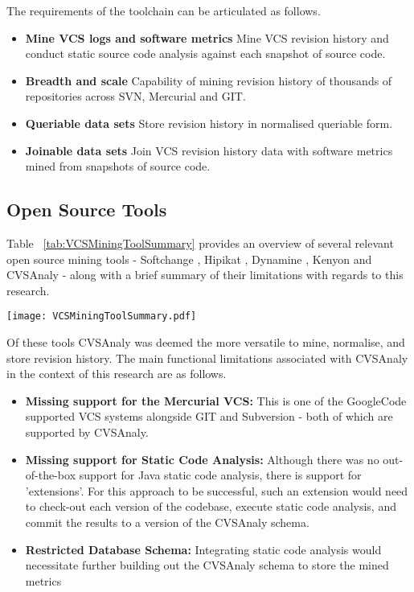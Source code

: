 The requirements of the toolchain can be articulated as follows.
\begin{itemize}
\item \textbf{Mine VCS logs and software metrics} Mine VCS revision history and conduct static source code analysis against each snapshot of source code.
\item \textbf{Breadth and scale} Capability of mining revision history of thousands of repositories across SVN, Mercurial and GIT.
\item \textbf{Queriable data sets} Store revision history in normalised queriable form.
\item \textbf{Joinable data sets} Join VCS revision history data with software metrics mined from snapshots of source code.
\end{itemize}

\subsection{Open Source Tools}
Table ~\ref{tab:VCSMiningToolSummary} provides an overview of several relevant open source mining tools - Softchange \citep{german2004mining}, Hipikat \citep{vcubranic2003hipikat}, Dynamine \citep{livshits2005dynamine}, Kenyon \citep{bevan2005facilitating} and CVSAnaly \citep{robles2004remote} - along with a brief summary of their limitations with regards to this research.

\begin{table}
\centering 
{}
\begin{tabular}
 \centering 
 \texttt{[image: VCSMiningToolSummary.pdf]}
 \label{tab:VCSMiningToolSummary}
\end{tabular}
\end{table}

Of these tools CVSAnaly was deemed the more versatile to mine, normalise, and store revision history. The main functional limitations associated with CVSAnaly in the context of this research are as follows.

\begin{itemize}
\item \textbf{Missing support for the Mercurial VCS:} This is one of the GoogleCode supported VCS systems alongside GIT and Subversion - both of which are supported by CVSAnaly.
\item \textbf{Missing support for Static Code Analysis:} Although there was no out-of-the-box support for Java static code analysis, there is support for 'extensions'. For this approach to be successful, such an extension would need to check-out each version of the codebase, execute static code analysis, and commit the results to a version of the CVSAnaly schema.
\item \textbf{Restricted Database Schema:} Integrating static code analysis would necessitate further building out the CVSAnaly schema to store the mined metrics 
\end{itemize}

